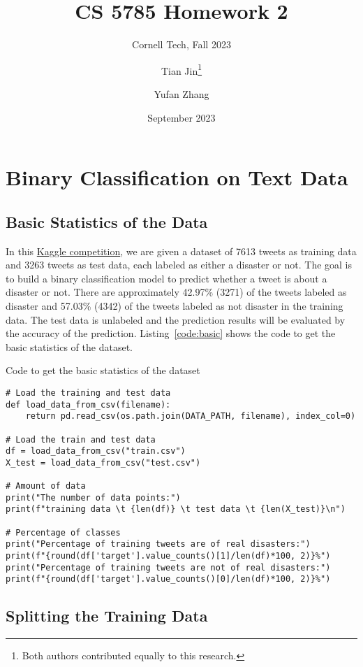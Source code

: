 \documentclass{article}
\title{CS 5785 Homework 2}
\subtitle{Cornell Tech, Fall 2023}
\author{
    Tian Jin\thanks{Both authors contributed equally to this research.} \footremember{note1}{Cornell Tech, NYC}
    \and 
    Yufan Zhang\footnotemark[1]
}
\date{September 2023}
\begin{document}
\maketitle

\section{Binary Classification on Text Data}
\subsection{Basic Statistics of the Data}
In this \href{https://www.kaggle.com/competitions/nlp-getting-started/overview}{Kaggle competition}, we are given a dataset of 7613 tweets as training data and 3263 tweets as test data, each labeled as either a disaster or not. The goal is to build a binary classification model to predict whether a tweet is about a disaster or not. There are approximately 42.97\% (3271) of the tweets labeled as disaster and 57.03\% (4342) of the tweets labeled as not disaster in the training data. The test data is unlabeled and the prediction results will be evaluated by the accuracy of the prediction. Listing~\ref{code:basic} shows the code to get the basic statistics of the dataset.

\begin{listing}[H]
\caption{Code to get the basic statistics of the dataset}
\label{code:basic}
\begin{verbatim}
# Load the training and test data
def load_data_from_csv(filename):
    return pd.read_csv(os.path.join(DATA_PATH, filename), index_col=0)

# Load the train and test data
df = load_data_from_csv("train.csv")
X_test = load_data_from_csv("test.csv")

# Amount of data
print("The number of data points:")
print(f"training data \t {len(df)} \t test data \t {len(X_test)}\n")

# Percentage of classes
print("Percentage of training tweets are of real disasters:")
print(f"{round(df['target'].value_counts()[1]/len(df)*100, 2)}%")
print("Percentage of training tweets are not of real disasters:")
print(f"{round(df['target'].value_counts()[0]/len(df)*100, 2)}%")
\end{verbatim}
\end{listing}

\subsection{Splitting the Training Data}
\end{document}
